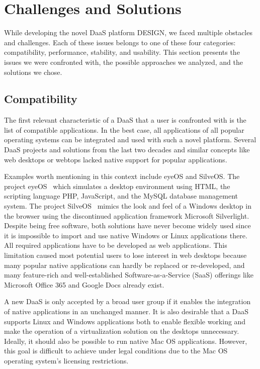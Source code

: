\documentclass[runningheads]{llncs}
\begin{document}
\section{Challenges and Solutions}
\label{sec:AnalysisPossibleComponents}


While developing the novel DaaS platform DESIGN, we faced multiple obstacles and challenges. Each of these issues belongs to one of these four categories: compatibility, performance, stability, and usability. This section presents the issues we were confronted with, the possible approaches we analyzed, and the solutions we chose.

\subsection{Compatibility}
% 

The first relevant characteristic of a DaaS that a user is confronted with is the list of compatible applications. In the best case, all applications of all popular operating systems can be integrated and used with such a novel platform. Several DaaS projects and solutions from the last two decades and similar concepts like web desktops or webtops lacked native support for popular applications.

Examples worth mentioning in this context include eyeOS and SilveOS. The project eyeOS~\cite{liu2012research,vidyabanu2011implementation} which simulates a desktop environment using HTML, the scripting language PHP, JavaScript, and the MySQL database management system. The project SilveOS~\cite{garmpis2016design} mimics the look and feel of a Windows desktop in the browser using the discontinued application framework Microsoft Silverlight. Despite being free software, both solutions have never become widely used since it is impossible to import and use native Windows or Linux applications there. All required applications have to be developed as web applications. This limitation caused most potential users to lose interest in web desktops because many popular native applications can hardly be replaced or re-developed, and many feature-rich and well-established Software-as-a-Service (SaaS) offerings like Microsoft Office 365 and Google Docs already exist.

A new DaaS is only accepted by a broad user group if it enables the integration of native applications in an unchanged manner. It is also desirable that a DaaS supports Linux and Windows applications both to enable flexible working and make the operation of a virtualization solution on the desktops unnecessary. Ideally, it should also be possible to run native Mac OS applications. However, this goal is difficult to achieve under legal conditions due to the Mac OS operating system's licensing restrictions.
\end{document}
